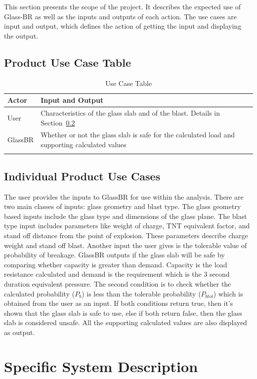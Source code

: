 \documentclass[12pt]{article}
\newcommand{\progname}{Glass-BR}
\begin{document}
This section presents the scope of the project. It describes the expected use of
\progname{} as well as the inputs and outputs of each action.  The use cases are
input and output, which defines the action of getting the input and displaying
the output.

\subsection{Product Use Case Table} \label{UseCase}

\begin{longtabu}{l X[l]}
\toprule
Actor & Input and Output
\\
\midrule
User & Characteristics of the glass slab and of the blast. Details in Section~\ref{sec_usecasedetails}
\\
GlassBR & Whether or not the glass slab is safe for the calculated load and supporting calculated values
\\
\bottomrule
\caption{Use Case Table}
\label{Table:UseCaseTabl}
\end{longtabu}
\subsection{Individual Product Use Cases}\label{sec_usecasedetails} 

The user provides the inputs to GlassBR for use within the analysis. There are
two main classes of inputs: glass geometry and blast type. The glass geometry
based inputs include the glass type and dimensions of the glass plane. The blast
type input includes parameters like weight of charge, TNT equivalent factor, and
stand off distance from the point of explosion. These parameters describe charge
weight and stand off blast. Another input the user gives is the tolerable value
of probability of breakage. GlassBR outputs if the glass slab will be safe by
comparing whether capacity is greater than demand. Capacity is the load
resistance calculated and demand is the requirement which is the 3 second
duration equivalent pressure. The second condition is to check whether the
calculated probability (${P_{b}}$) is less than the tolerable probability
(${P_{btol}}$) which is obtained from the user as an input. If both conditions
return true, then it's shown that the glass slab is safe to use, else if both
return false, then the glass slab is considered unsafe. All the supporting
calculated values are also displayed as output.

\section{Specific System Description}
\end{document}
